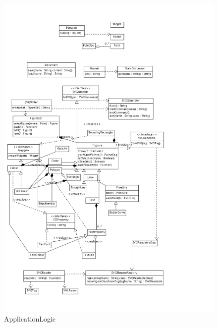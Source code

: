 \begin{figure}[!ht]
\centering
\includegraphics{applogic.png}
\caption{ApplicationLogic}
\end{figure}

